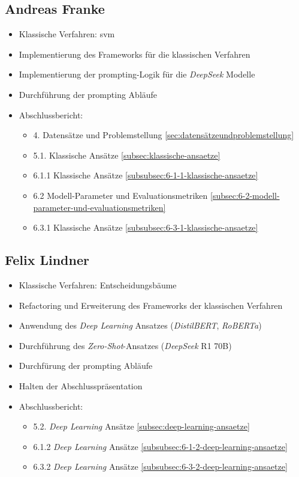 \begin{multicols}{2}
\subsection{Andreas Franke}
\begin{itemize}
    \item Klassische Verfahren: \gls{svm}
    \item Implementierung des Frameworks für die klassischen Verfahren
    \item Implementierung der prompting-Logik für die \textit{DeepSeek} Modelle
    \item Durchführung der prompting Abläufe
    \item Abschlussbericht: 
    \begin{itemize}
        \item 4. Datensätze und Problemstellung \ref{sec:datensätzeundproblemstellung}
        \item 5.1. Klassische Ansätze \ref{subsec:klassische-ansaetze}
        \item 6.1.1 Klassische Ansätze \ref{subsubsec:6-1-1-klassische-ansaetze}
        \item 6.2 Modell-Parameter und Evaluationsmetriken \ref{subsec:6-2-modell-parameter-und-evaluationsmetriken}
        \item 6.3.1 Klassische Ansätze \ref{subsubsec:6-3-1-klassische-ansaetze}
    \end{itemize}
\end{itemize}

\subsection{Felix Lindner}
\begin{itemize}
    \item Klassische Verfahren: Entscheidungsbäume
    \item Refactoring und Erweiterung des Frameworks der klassischen Verfahren
    \item Anwendung des \textit{Deep Learning} Ansatzes (\textit{DistilBERT}, \textit{RoBERTa})
    \item Durchführung des \textit{Zero-Shot}-Ansatzes (\textit{DeepSeek} R1 70B)
    \item Durchfürung der prompting Abläufe
    \item Halten der Abschlusspräsentation
    \item Abschlussbericht: 
    \begin{itemize}
        \item 5.2. \textit{Deep Learning} Ansätze \ref{subsec:deep-learning-ansaetze}
        \item 6.1.2 \textit{Deep Learning} Ansätze \ref{subsubsec:6-1-2-deep-learning-ansaetze}
        \item 6.3.2 \textit{Deep Learning} Ansätze \ref{subsubsec:6-3-2-deep-learning-ansaetze}
    \end{itemize}
\end{itemize}


\end{multicols}
